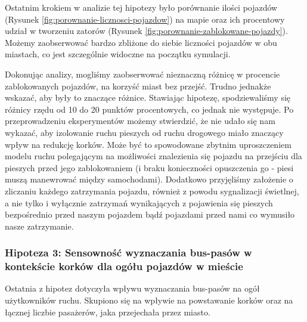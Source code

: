 \documentclass{article}
\begin{document}
Ostatnim krokiem w analizie tej hipotezy było porównanie ilości pojazdów (Rysunek \ref{fig:porownanie-licznosci-pojazdow}) na mapie oraz ich procentowy udział w tworzeniu zatorów (Rysunek \ref{fig:porownanie-zablokowane-pojazdy}). Możemy zaobserwować bardzo zbliżone do siebie liczności pojazdów w obu miastach, co jest szczególnie widoczne na początku symulacji.

Dokonując analizy, mogliśmy zaobserwować nieznaczną różnicę w procencie zablokowanych pojazdów, na korzyść miast bez przejść. Trudno jednakże wskazać, aby były to znaczące różnice. Stawiając hipotezę, spodziewaliśmy się różnicy rzędu od 10 do 20 punktów procentowych, co jednak nie występuje.
Po przeprowadzeniu eksperymentów możemy stwierdzić, że nie udało się nam wykazać, aby izolowanie ruchu pieszych od ruchu drogowego miało znaczący wpływ na redukcję korków. Może być to spowodowane zbytnim uproszczeniem modelu ruchu polegającym na możliwości znalezienia się pojazdu na przejściu dla pieszych przed jego zablokowaniem (i braku konieczności opuszczenia go - piesi muszą manewrować między samochodami). Dodatkowo przyjęliśmy założenie o zliczaniu każdego zatrzymania pojazdu, również z powodu sygnalizacji świetlnej, a nie tylko i wyłącznie zatrzymań wynikających z pojawienia się pieszych bezpośrednio przed naszym pojazdem bądź pojazdami przed nami co wymusiło nasze zatrzymanie.

\subsubsection{Hipoteza 3: Sensowność wyznaczania bus-pasów w kontekście korków dla ogółu pojazdów w mieście}
Ostatnia z hipotez dotyczyła wpływu wyznaczania bus-pasów na ogół użytkowników ruchu. Skupiono się na wpływie na powstawanie korków oraz na łącznej liczbie pasażerów, jaka przejechała przez miasto.
\end{document}
